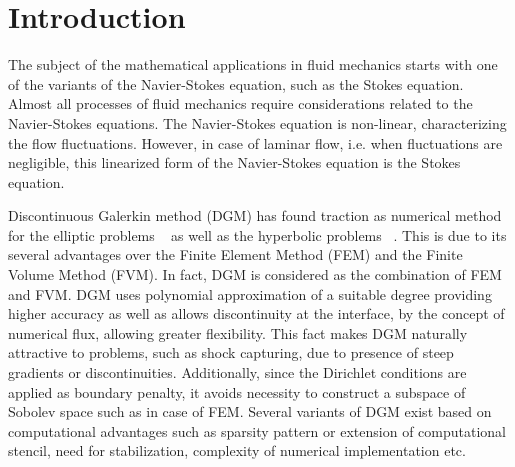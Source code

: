 \documentclass[graybox]{svmult}
\begin{document}

\section{Introduction}
\label{introduction}

The subject of the mathematical applications in fluid mechanics starts with one of the variants of the Navier-Stokes equation, such as the Stokes equation. Almost all processes of fluid mechanics require considerations related to the Navier-Stokes equations. The Navier-Stokes equation is non-linear, characterizing the flow fluctuations. However, in case of laminar flow, i.e. when fluctuations are negligible, this linearized form of the Navier-Stokes equation is the Stokes equation.

Discontinuous Galerkin method (DGM) has found traction as numerical method for the elliptic problems ~\cite{peraire} as well as the hyperbolic problems ~\cite{hyperbolic}. This is due to its several advantages over the Finite Element Method (FEM) and the Finite Volume Method (FVM). In fact, DGM is considered as the combination of FEM and FVM. DGM uses polynomial approximation of a suitable degree providing higher accuracy as well as allows discontinuity at the interface, by the concept of numerical flux, allowing greater flexibility. This fact makes DGM naturally attractive to problems, such as shock capturing, due to presence of steep gradients or discontinuities. Additionally, since the Dirichlet conditions are applied as boundary penalty, it avoids necessity to construct a subspace of Sobolev space such as in case of FEM. Several variants of DGM exist based on computational advantages such as sparsity pattern or extension of computational stencil, need for stabilization, complexity of numerical implementation etc.
\end{document}
